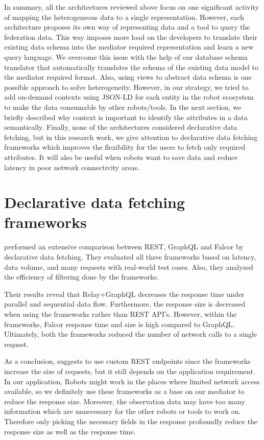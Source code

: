 	In summary, all the architectures reviewed above focus on one significant activity of mapping the heterogeneous data to a single representation. However, each architecture proposes its own way of representing data and a tool to query the federation data. This way imposes more load on the developers to translate their existing data schema into the mediator required representation and learn a new query language. We overcome this issue with the help of our database schema translator that automatically translates the schema of the existing data model to the mediator required format. Also,  using views to abstract data schema is one possible approach to solve heterogeneity. However, in our strategy, we tried to add on-demand contexts using JSON-LD for each entity in the robot ecosystem to make the data consumable by other robots/tools. In the next section, we briefly described why context is important to identify the attributes in a data semantically. Finally, none of the architectures considered declarative data fetching, but in this research work, we give attention to declarative data fetching frameworks which improves the flexibility for the users to fetch only required attributes. It will also be useful when robots want to save data and reduce latency in poor network connectivity areas.
	
	\section{Declarative data fetching frameworks}
	
	\citet{cederlund2016performance} performed an extensive comparison between REST, GraphQL and Falcor by declarative data fetching. They evaluated all three frameworks based on latency, data volume, and many requests with real-world test cases. Also, they analyzed the efficiency of filtering done by the frameworks.
	
	Their results reveal that Relay+GraphQL decreases the response time under parallel and sequential data flow. Furthermore, the response size is decreased when using the frameworks rather than REST API's. However, within the frameworks, Falcor response time and size is high compared to GraphQL. Ultimately, both the frameworks reduced the number of network calls to a single request.
	
	As a conclusion, \citet{cederlund2016performance} suggests to use custom REST endpoints since the frameworks increase the size of requests, but it still depends on the application requirement. In our application, Robots might work in the places where limited network access available, so we definitely use these frameworks as a base on our mediator to reduce the response size. Moreover, the observation data may have too many information which are unnecessary for the other robots or tools to work on. Therefore only picking the necessary fields in the response profoundly reduce the response size as well as the response time.

